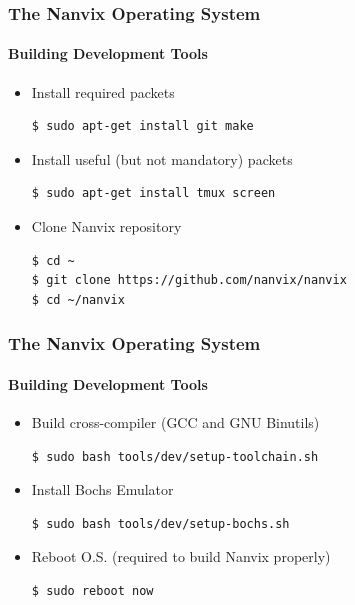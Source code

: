 \documentclass{beamer}
\begin{document}
	\begin{frame}[containsverbatim]
	\frametitle{The Nanvix Operating System}
	\framesubtitle{Building Development Tools}
	\begin{itemize}
	\setlength\itemsep{1.0em}
		\item Install required packets
	\begin{lstlisting}[language=bash,numbers=none,frame=single]
$ sudo apt-get install git make
	\end{lstlisting}

		\item Install useful (but not mandatory) packets
	\begin{lstlisting}[language=bash,numbers=none,frame=single]
$ sudo apt-get install tmux screen
	\end{lstlisting}

		\item Clone Nanvix repository
	\begin{lstlisting}[language=bash,numbers=none,frame=single]
$ cd ~
$ git clone https://github.com/nanvix/nanvix
$ cd ~/nanvix
	\end{lstlisting}
	\end{itemize}

	\end{frame}

	\begin{frame}[containsverbatim]
	\frametitle{The Nanvix Operating System}
	\framesubtitle{Building Development Tools}
	\begin{itemize}
	\setlength\itemsep{1.0em}
		\item Build cross-compiler (GCC and GNU Binutils)
	\begin{lstlisting}[language=bash,numbers=none,frame=single]
$ sudo bash tools/dev/setup-toolchain.sh
	\end{lstlisting}

		\item Install Bochs Emulator
	\begin{lstlisting}[language=bash,numbers=none,frame=single]
$ sudo bash tools/dev/setup-bochs.sh
	\end{lstlisting}

		\item Reboot O.S. (required to build Nanvix properly)

	\begin{lstlisting}[language=bash,numbers=none,frame=single]
$ sudo reboot now
	\end{lstlisting}

	\end{itemize}
	\end{frame}
\end{document}
